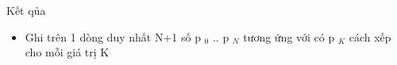 Kết qủa
\begin{itemize}
	\item Ghi trên 1 dòng duy nhất N+1 số p $_ 0 $ .. p $_ N $ tương ứng với có p $_ K $ cách xếp cho mỗi giá trị K
\end{itemize}